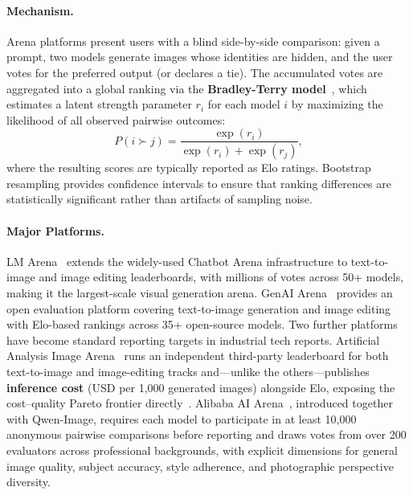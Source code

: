 \documentclass{llmxive}
\begin{document}
\paragraph{Mechanism.} Arena platforms present users with a blind side-by-side comparison: given a prompt, two models generate images whose identities are hidden, and the user votes for the preferred output (or declares a tie). The accumulated votes are aggregated into a global ranking via the \textbf{Bradley-Terry model}~\citep{ChatbotArena}, which estimates a latent strength parameter $r_i$ for each model $i$ by maximizing the likelihood of all observed pairwise outcomes:
\begin{equation}
    P(i \succ j) = \frac{\exp(r_i)}{\exp(r_i) + \exp(r_j)},
\end{equation}
where the resulting scores are typically reported as Elo ratings. Bootstrap resampling provides confidence intervals to ensure that ranking differences are statistically significant rather than artifacts of sampling noise.

\paragraph{Major Platforms.} LM Arena~\citep{ChatbotArena} extends the widely-used Chatbot Arena infrastructure to text-to-image and image editing leaderboards, with millions of votes across 50+ models, making it the largest-scale visual generation arena. GenAI Arena~\citep{GenAI-Arena} provides an open evaluation platform covering text-to-image generation and image editing with Elo-based rankings across 35+ open-source models. Two further platforms have become standard reporting targets in industrial tech reports. Artificial Analysis Image Arena~\citep{aaarena2025} runs an independent third-party leaderboard for both text-to-image and image-editing tracks and---unlike the others---publishes \textbf{inference cost} (USD per 1{,}000 generated images) alongside Elo, exposing the cost--quality Pareto frontier directly~\citep{seedream2025seedream, gao2025seedream, cai2025z}. Alibaba AI Arena~\citep{wu2025qwen}, introduced together with Qwen-Image, requires each model to participate in at least 10{,}000 anonymous pairwise comparisons before reporting and draws votes from over 200 evaluators across professional backgrounds, with explicit dimensions for general image quality, subject accuracy, style adherence, and photographic perspective diversity.
\end{document}
